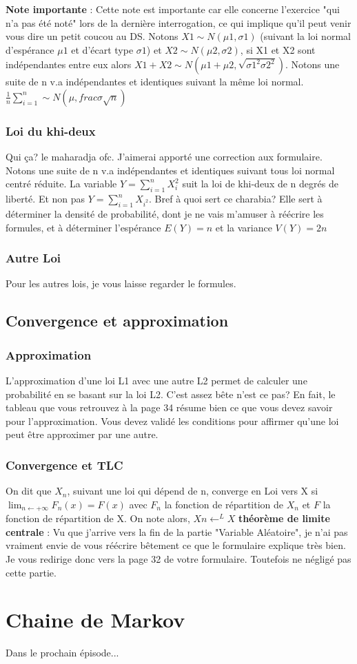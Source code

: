 \documentclass[a4paper]{article}
\begin{document}
\textbf{Note importante} : Cette note est importante car elle concerne l'exercice "qui n'a pas été noté" lors de la dernière interrogation, ce qui implique qu'il peut venir vous dire un petit coucou au DS. Notons $X1 \sim N(\mu 1, \sigma 1)$ (suivant la loi normal d'espérance $\mu 1$ et d'écart type $\sigma 1$) et $X2 \sim N(\mu 2, \sigma 2)$, si X1 et X2 sont indépendantes entre eux alors $X1+X2 \sim N(\mu 1 + \mu 2, \sqrt{\sigma 1^2\sigma 2^2})$. \newline
Notons une suite de n v.a indépendantes et identiques suivant la même loi normal. $\frac{1}{n} \sum_{i=1}^n \sim N(\mu, frac{\sigma}{\sqrt{n}})$

\subsubsection{Loi du khi-deux}
Qui ça? le maharadja ofc. J'aimerai apporté une correction aux formulaire. Notons une suite de n v.a indépendantes et identiques suivant tous loi normal centré réduite. La variable $Y = \sum_{i=1}^n X_i^2$ suit la loi de khi-deux de n degrés de liberté. Et non pas $Y = \sum_{i=1}^n X_{i^2}$. \newline
Bref à quoi sert ce charabia? Elle sert à déterminer la densité de probabilité, dont je ne vais m'amuser à réécrire les formules, et à déterminer l'espérance $E(Y)= n$ et la variance $V(Y)= 2n$

\subsubsection{Autre Loi}
Pour les autres lois, je vous laisse regarder le formules.

\subsection{Convergence et approximation}

\subsubsection{Approximation}
L'approximation d'une loi L1 avec une autre L2 permet de calculer une probabilité en se basant sur la loi L2. C'est assez bête n'est ce pas? En fait, le tableau que vous retrouvez à la page 34 résume bien ce que vous devez savoir pour l'approximation. Vous devez validé les conditions pour affirmer qu'une loi peut être approximer par une autre.

\subsubsection{Convergence et TLC}
On dit que $X_n$, suivant une loi qui dépend de n, converge en Loi vers X si $\lim_{n\leftarrow +\infty}  F_n(x) = F(x) $ avec $F_n$ la fonction de répartition de $X_n$ et $F$ la fonction de répartition de X. On note alors, $Xn \leftarrow^L X$
\textbf{théorème de limite centrale} : Vu que j'arrive vers la fin de la partie "Variable Aléatoire", je n'ai pas vraiment envie de vous réécrire bêtement ce que le formulaire explique très bien. Je vous redirige donc vers la page 32 de votre formulaire. Toutefois ne négligé pas cette partie.

\section{Chaine de Markov}

Dans le prochain épisode...
\end{document}
